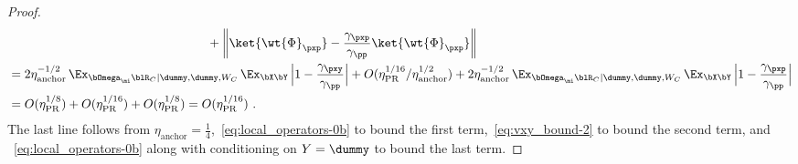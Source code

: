\begin{proof}
\begin{align*}
		& \qquad \qquad \qquad \qquad \qquad \qquad \qquad \qquad + \left \| \ket{\wt{\Phi}_{\pxp}} - \frac{\gamma_{\pxp}}{\gamma_\pp} \ket{\wt{\Phi}_{\pxp}}\right \|\\
		&= 2\eta_{\text{anchor}}^{-1/2} \, \Ex_{\bOmega_{\mi} \blR_C | \dummy,\dummy,W_C}  \, \Ex_{\bX \bY} \, \Big | 1 - \frac{\gamma_{\pxy}}{\gamma_\pp} \Big | + O(\eta_{\text{PR}}^{1/16}/\eta_{\text{anchor}}^{1/2}) + 2\eta_{\text{anchor}}^{-1/2} \, \Ex_{\bOmega_{\mi} \blR_C | \dummy,\dummy,W_C}  \, \Ex_{\bX \bY} \, \Big | 1 - \frac{\gamma_{\pxp}}{\gamma_\pp} \Big | \\
		&= O(\eta_{\text{PR}}^{1/8}) + O(\eta_{\text{PR}}^{1/16}) + O(\eta_{\text{PR}}^{1/8}) = O(\eta_{\text{PR}}^{1/16})~.
	\end{align*}
	The last line follows from $\eta_{\text{anchor}} = \frac{1}{4}$,~\eqref{eq:local_operators-0b} to bound the first term,~\eqref{eq:vxy_bound-2} to bound the second term, and ~\eqref{eq:local_operators-0b} along with conditioning on $Y = \dummy$ to bound the last term.
	
\end{proof}